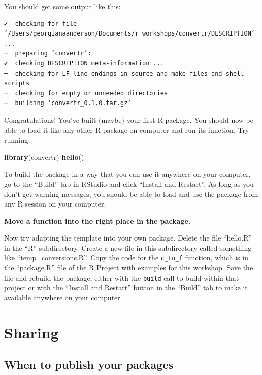 \documentclass[]{tufte-book}
\newenvironment{Shaded}{}{}
\newcommand{\KeywordTok}[1]{\textcolor[rgb]{0.00,0.44,0.13}{\textbf{#1}}}
\newcommand{\NormalTok}[1]{#1}
\begin{document}
You should get some output like this:

\begin{verbatim}
✔  checking for file ‘/Users/georgianaanderson/Documents/r_workshops/convertr/DESCRIPTION’ ...
─  preparing ‘convertr’:
✔  checking DESCRIPTION meta-information ...
─  checking for LF line-endings in source and make files and shell scripts
─  checking for empty or unneeded directories
─  building ‘convertr_0.1.0.tar.gz’
\end{verbatim}

Congratulations! You've built (maybe) your first R package. You should now be able to
load it like any other R package on computer and run its function. Try running:

\begin{Shaded}
\begin{Highlighting}[]
\KeywordTok{library}\NormalTok{(convertr)}
\KeywordTok{hello}\NormalTok{()}
\end{Highlighting}
\end{Shaded}

To build the package in a way that you can use it anywhere on your computer,
go to the ``Build'' tab in RStudio and click ``Install and Restart''. As long
as you don't get warning messages, you should be able to load and use the
package from any R session on your computer.

\textbf{Move a function into the right place in the package.}

Now try adapting the template into your own package. Delete the file
``hello.R'' in the ``R'' subdirectory. Create a new file in this subdirectory
called something like ``temp\_conversions.R''. Copy the code for the
\texttt{c\_to\_f} function, which is in the ``package.R'' file of the R Project
with examples for this workshop. Save the file and rebuild the package,
either with the \texttt{build} call to build within that project or with the
``Install and Restart'' button in the ``Build'' tab to make it available
anywhere on your computer.

\hypertarget{sharing}{%
\section{Sharing}\label{sharing}}

\hypertarget{when-to-publish-your-packages}{%
\subsection{When to publish your packages}\label{when-to-publish-your-packages}}
\end{document}
